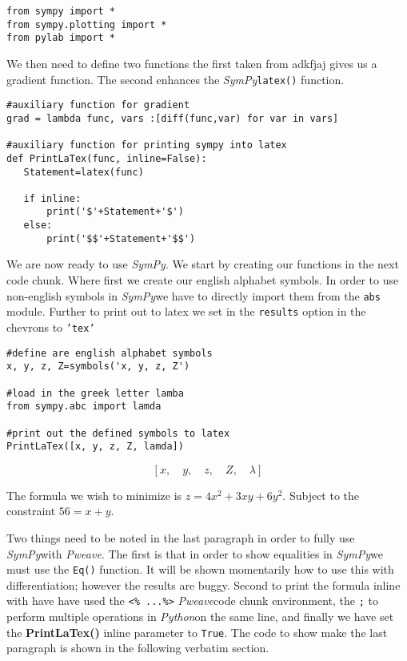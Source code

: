 \documentclass[a4paper,11pt,final]{article}
\newcommand{\pweave}{\emph{Pweave}\space}
\newcommand{\python}{\emph{Python}\space}
\newcommand{\sympy}{\emph{SymPy}\space}
\begin{document}
\begin{verbatim}
from sympy import *
from sympy.plotting import *
from pylab import *
\end{verbatim}


	We then need to define two functions the first taken from adkfjaj gives us a gradient function. The second enhances the \sympy \texttt{latex()} function.

\begin{verbatim}
#auxiliary function for gradient
grad = lambda func, vars :[diff(func,var) for var in vars]

#auxiliary function for printing sympy into latex
def PrintLaTex(func, inline=False):
   Statement=latex(func)

   if inline:
       print('$'+Statement+'$')
   else:
       print('$$'+Statement+'$$')
\end{verbatim}


		We are now ready to use \sympy. We start by creating our functions in the next code chunk. Where first we create our english alphabet symbols. In order to use non-english symbols in \sympy we have to directly import them from the \texttt{abs} module. Further to print out to latex we set in the \texttt{results} option in the chevrons to \texttt{'tex'}

\begin{verbatim}
#define are english alphabet symbols
x, y, z, Z=symbols('x, y, z, Z')

#load in the greek letter lamba
from sympy.abc import lamda

#print out the defined symbols to latex
PrintLaTex([x, y, z, Z, lamda])
\end{verbatim}
$$\left [ x, \quad y, \quad z, \quad Z, \quad \lambda\right ]$$




		The formula we wish to minimize is $z = 4 x^{2} + 3 x y + 6 y^{2}$. Subject to the constraint $56 = x + y$.

		Two things need to be noted in the last paragraph in order to fully use \sympy with \pweave. The first is that in order to show equalities in \sympy we must use the \texttt{Eq()} function. It will be shown momentarily how to use this with differentiation; however the results are buggy. Second to print the formula inline with have have used the \texttt{<\% ...\%>} \pweave code chunk environment, the \texttt{;} to perform multiple operations in \python on the same line, and finally we have set the \textbf{PrintLaTex()} inline parameter to \texttt{True}. The code to show make the last paragraph is shown in the following verbatim section.
\end{document}
